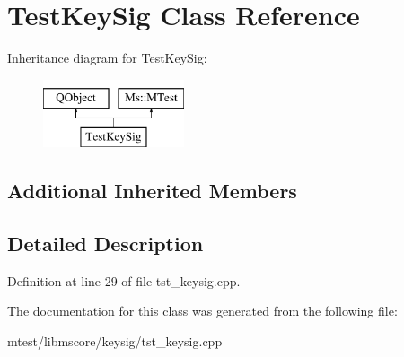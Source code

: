 \hypertarget{class_test_key_sig}{}\section{Test\+Key\+Sig Class Reference}
\label{class_test_key_sig}
Inheritance diagram for Test\+Key\+Sig\+:\begin{figure}[H]
\begin{center}
\leavevmode
\includegraphics[height=2.000000cm]{class_test_key_sig}
\end{center}
\end{figure}
\subsection*{Additional Inherited Members}


\subsection{Detailed Description}


Definition at line 29 of file tst\+\_\+keysig.\+cpp.



The documentation for this class was generated from the following file\+:\begin{DoxyCompactItemize}
\item 
mtest/libmscore/keysig/tst\+\_\+keysig.\+cpp\end{DoxyCompactItemize}
